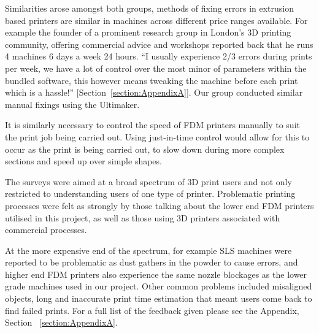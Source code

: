\documentclass[pdftex, 11pt]{report} %
\begin{document}
Similarities arose amongst both groups, methods of fixing errors in extrusion based printers are similar in machines across different price ranges available. For example the founder of a prominent research group in London's 3D printing community, offering commercial advice and workshops reported back that he runs 4 machines 6 days a week 24 hours. ``I usually experience 2/3 errors during prints per week, we have a lot of control over the most minor of parameters within the bundled software, this however means tweaking the machine before each print which is a hassle!'' [Section~\ref{section:AppendixA}]. Our group conducted similar manual fixings using the Ultimaker. 

It is similarly necessary to control the speed of FDM printers manually to suit the print job being carried out. Using just-in-time control would allow for this to occur as the print is being carried out, to slow down during more complex sections and speed up  over simple shapes. 
 
The surveys were aimed at a broad spectrum of 3D print users and not only restricted to understanding users of one type of printer. Problematic printing processes were felt as strongly by those talking about the lower end FDM printers utilised in this project, as well as those using 3D printers associated with commercial processes. 

At the more expensive end of the spectrum, for example SLS machines were reported to be problematic as dust gathers in the powder to cause errors, and higher end FDM printers also experience the same nozzle blockages as the lower grade machines used in our project. Other common problems included misaligned objects, long and inaccurate print time estimation that meant users come back to find failed prints. For a full list of the feedback given please see the Appendix, Section ~\ref{section:AppendixA}.
\end{document}
